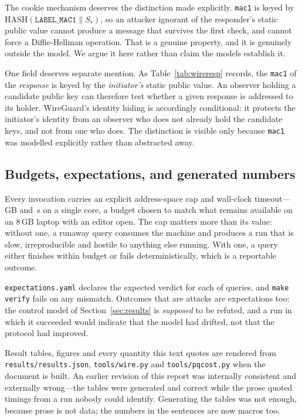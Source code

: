  The cookie mechanism deserves
the distinction made explicitly. \texttt{mac1} is keyed by
\(\mathrm{HASH}(\mathtt{LABEL\_MAC1} \mathbin\| S_r)\), so an attacker
ignorant of the responder's static public value cannot produce a message that
survives the first check, and cannot force a Diffie-Hellman operation. That is
a genuine property, and it is genuinely outside the model. We argue it here
rather than claim the models establish it.

 One field deserves separate mention. As
Table~\ref{tab:wireresp} records, the \texttt{mac1} of the \emph{response} is
keyed by the \emph{initiator's} static public value. An observer holding a
candidate public key can therefore test whether a given response is addressed
to its holder. WireGuard's identity hiding is accordingly conditional: it
protects the initiator's identity from an observer who does not already hold
the candidate keys, and not from one who does. The distinction is visible only
because \texttt{mac1} was modelled explicitly rather than abstracted away.

\subsection{Budgets, expectations, and generated numbers}

 Every invocation carries an explicit
address-space cap and wall-clock timeout---\wgMemCap\,GB and \wgBudget\,s on a
single core, a budget chosen to match what remains available on an 8\,GB
laptop with an editor open. The cap matters more than its value: without one,
a runaway query consumes the machine and produces a run that is slow,
irreproducible and hostile to anything else running. With one, a query either
finishes within budget or fails deterministically, which is a reportable
outcome.

\texttt{expectations.yaml} declares the expected verdict for each of
\wgExpectations{} queries, and \texttt{make verify} fails on any mismatch.
Outcomes that are attacks are expectations too: the control model of
Section~\ref{sec:results} is \emph{supposed} to be refuted, and a run in which
it succeeded would indicate that the model had drifted, not that the protocol
had improved.

 Result tables, figures and every
quantity this text quotes are rendered from \texttt{results/results.json},
\texttt{tools/wire.py} and \texttt{tools/pqcost.py} when the document is
built. An earlier revision of this report was internally consistent and
externally wrong---the tables were generated and correct while the prose
quoted timings from a run nobody could identify. Generating the tables was not
enough, because prose is not data; the numbers in the sentences are now macros
too.
